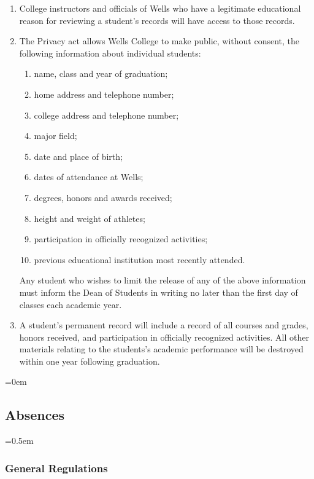 \documentclass{manual}
\newcommand{\modified}[1]{}
\newcommand{\oldbreak}[1]{}
\let\oldsubsection\subsection
\renewcommand\subsection{\leftskip=0em\oldsubsection}
\let\oldsubsubsection\subsubsection
\renewcommand\subsubsection{\leftskip=0.5em\oldsubsubsection}
\newcommand{\itemLevelA}{\alph*.}
\newcommand{\itemLevelB}{\arabic*)}
\newcommand{\itemRefA}{\alph*}
\newcommand{\itemRefB}{\arabic*}
\begin{document}
\begin{enumerate}[label=\itemLevelA,ref=\itemRefA]
\begin{enumerate}[label=\itemLevelB,ref=\itemRefB]
\item College instructors and officials of Wells who have a legitimate educational reason for reviewing a student's records will have access to those records.

\item The Privacy act allows Wells College to make public, without consent, the following information about individual students:
\begin{enumerate}[label=\alph*)]
\item name, class and year of graduation;
\item home address and telephone number;
\item college address and telephone number;
\item major field;
\item date and place of birth;
\item dates of attendance at Wells;
\item degrees, honors and awards received;
\item height and weight of athletes;
\item participation in officially recognized activities;
\item previous educational institution most recently attended.
\end{enumerate}

Any student who wishes to limit the release of any of the above information must inform the Dean of Students in writing no later than the first day of classes each academic year.

\item A student's permanent record will include a record of all courses and grades, honors received, and participation in officially recognized activities. All other materials relating to the students's academic performance will be destroyed within one year following graduation.

\end{enumerate}
\end{enumerate}
\oldbreak{VII-8}



\subsection{Absences}

\subsubsection{General Regulations}\modified{5/14/02}
\end{document}
